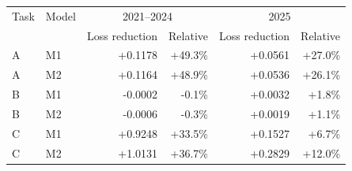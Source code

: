 \begin{tabular}{llrrrr}
\toprule
Task & Model & \multicolumn{2}{c}{2021--2024} & \multicolumn{2}{c}{2025} \\ 
 & & Loss reduction & Relative & Loss reduction & Relative \\
\midrule
A & M1 & +0.1178 & +49.3\% & +0.0561 & +27.0\% \\
A & M2 & +0.1164 & +48.9\% & +0.0536 & +26.1\% \\
B & M1 & -0.0002 & -0.1\% & +0.0032 & +1.8\% \\
B & M2 & -0.0006 & -0.3\% & +0.0019 & +1.1\% \\
C & M1 & +0.9248 & +33.5\% & +0.1527 & +6.7\% \\
C & M2 & +1.0131 & +36.7\% & +0.2829 & +12.0\% \\
\bottomrule
\end{tabular}
